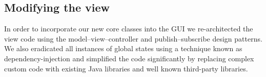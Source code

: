 \subsection{Modifying the view}
In order to incorporate our new core classes into the GUI we re-architected the view code using the model--view--controller and publish--subscribe design patterns. We also eradicated all instances of global states using a technique known as dependency-injection and simplified the code significantly by replacing complex custom code with existing Java libraries and well known third-party libraries.